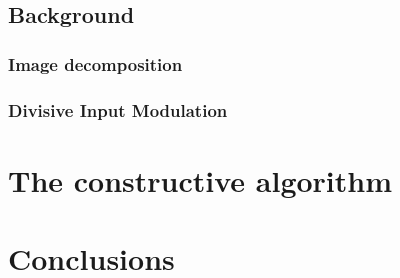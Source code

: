 \documentclass{beamer}
\begin{document}
		\subsection{Background}
			\begin{frame}
				\frametitle{Image decomposition}
			\end{frame}
			\begin{frame}
				\frametitle{Divisive Input Modulation}
			\end{frame}
		
	\section{The constructive algorithm}
	
	\section{Conclusions}
		
\end{document}
